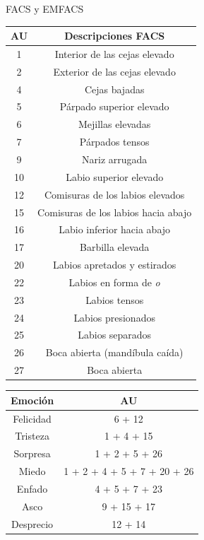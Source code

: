 \documentclass{beamer}
\begin{document}
\begin{frame}{FACS y EMFACS}
\begin{table}[h!]
\begin{minipage}{0.45\linewidth}
\centering
\begin{adjustbox}{max width=\textwidth}
\begin{tabular}{|c|c|}
     \hline
    \textbf{AU} & \textbf{Descripciones FACS} \\
    \hline
     1 & Interior de las cejas elevado\\ 
     2 & Exterior de las cejas elevado \\ 
     4 & Cejas bajadas \\
     5 & Párpado superior elevado\\
     6 & Mejillas elevadas \\ 
     7 & Párpados tensos \\
     9 & Nariz arrugada \\
     10 & Labio superior elevado \\
     12 & Comisuras de los labios elevados \\ 
     15 & Comisuras de los labios hacia abajo \\
     16 & Labio inferior hacia abajo \\
     17 & Barbilla elevada \\
     20 & Labios apretados y estirados\\
     22 & Labios en forma de \textit{o} \\
     23 & Labios tensos \\
     24 & Labios presionados \\
     25 & Labios separados \\
     26 & Boca abierta (mandíbula caída)\\
     27 & Boca abierta \\
     \hline
 \end{tabular}
\end{adjustbox}
\end{minipage} \hspace{0.1cm}
\begin{minipage}{0.45\linewidth}
\centering
\begin{adjustbox}{max width=\textwidth}
\begin{tabular}{|c|c|}
     \hline
    \textbf{Emoción} & \textbf{AU} \\
    \hline
     Felicidad & 6 + 12\\ 
     Tristeza & 1 + 4 + 15 \\ 
     Sorpresa & 1 + 2 + 5 + 26 \\
     Miedo & 1 + 2 + 4 + 5 + 7 + 20 + 26\\
     Enfado & 4 + 5 + 7 + 23 \\ 
     Asco & 9 + 15 + 17 \\
     Desprecio & 12 + 14 \\
     \hline
 \end{tabular}
\end{adjustbox}
\end{minipage}
\end{table}


\end{frame}
\end{document}
